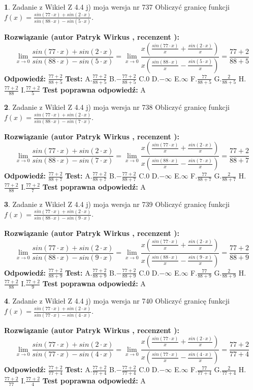 \documentclass[12pt, a4paper]{article}
\theoremstyle{definition} %
\newtheorem{zad}{}
\newcommand{\zadStart}[1]{\begin{zad}#1\newline}
\newcommand{\zadStop}{\end{zad}}
\newcommand{\rozwStart}[2]{\noindent \textbf{Rozwiązanie (autor #1 , recenzent #2): }\newline}
\newcommand{\rozwStop}{\newline}
\newcommand{\odpStart}{\noindent \textbf{Odpowiedź:}\newline}
\newcommand{\odpStop}{\newline}
\newcommand{\testStart}{\noindent \textbf{Test:}\newline}
\newcommand{\testStop}{\newline}
\newcommand{\kluczStart}{\noindent \textbf{Test poprawna odpowiedź:}\newline}
\newcommand{\kluczStop}{\newline}
\begin{document}
\zadStart{Zadanie z Wikieł Z 4.4 j) moja wersja nr 737}
Obliczyć granicę funkcji $f(x)=\frac{sin(77\cdot x) +sin(2\cdot x)}{sin(88\cdot x) -sin(5\cdot x)}$.
\zadStop
\rozwStart{Patryk Wirkus}{}
$$\lim\limits_{x\to 0}\frac{sin(77\cdot x) +sin(2\cdot x)}{sin(88\cdot x) -sin(5\cdot x)}=\lim\limits_{x\to 0}\frac{x(\frac{sin(77\cdot x)}{x}+\frac{sin(2\cdot x)}{x})}{x(\frac{sin(88\cdot x)}{x}-\frac{sin(5\cdot x)}{x})}=\frac{77+2}{88+5}$$
\rozwStop
\odpStart
$\frac{77+2}{88+5}$
\odpStop
\testStart
A.$\frac{77+2}{88+5}$
B.$-\frac{77+2}{88+5}$
C.$0$
D.$-\infty$
E.$\infty$
F.$\frac{77}{88+5}$
G.$\frac{2}{88+5}$
H.$\frac{77+2}{88}$
I.$\frac{77+2}{5}$
\testStop
\kluczStart
A
\kluczStop



\zadStart{Zadanie z Wikieł Z 4.4 j) moja wersja nr 738}
Obliczyć granicę funkcji $f(x)=\frac{sin(77\cdot x) +sin(2\cdot x)}{sin(88\cdot x) -sin(7\cdot x)}$.
\zadStop
\rozwStart{Patryk Wirkus}{}
$$\lim\limits_{x\to 0}\frac{sin(77\cdot x) +sin(2\cdot x)}{sin(88\cdot x) -sin(7\cdot x)}=\lim\limits_{x\to 0}\frac{x(\frac{sin(77\cdot x)}{x}+\frac{sin(2\cdot x)}{x})}{x(\frac{sin(88\cdot x)}{x}-\frac{sin(7\cdot x)}{x})}=\frac{77+2}{88+7}$$
\rozwStop
\odpStart
$\frac{77+2}{88+7}$
\odpStop
\testStart
A.$\frac{77+2}{88+7}$
B.$-\frac{77+2}{88+7}$
C.$0$
D.$-\infty$
E.$\infty$
F.$\frac{77}{88+7}$
G.$\frac{2}{88+7}$
H.$\frac{77+2}{88}$
I.$\frac{77+2}{7}$
\testStop
\kluczStart
A
\kluczStop



\zadStart{Zadanie z Wikieł Z 4.4 j) moja wersja nr 739}
Obliczyć granicę funkcji $f(x)=\frac{sin(77\cdot x) +sin(2\cdot x)}{sin(88\cdot x) -sin(9\cdot x)}$.
\zadStop
\rozwStart{Patryk Wirkus}{}
$$\lim\limits_{x\to 0}\frac{sin(77\cdot x) +sin(2\cdot x)}{sin(88\cdot x) -sin(9\cdot x)}=\lim\limits_{x\to 0}\frac{x(\frac{sin(77\cdot x)}{x}+\frac{sin(2\cdot x)}{x})}{x(\frac{sin(88\cdot x)}{x}-\frac{sin(9\cdot x)}{x})}=\frac{77+2}{88+9}$$
\rozwStop
\odpStart
$\frac{77+2}{88+9}$
\odpStop
\testStart
A.$\frac{77+2}{88+9}$
B.$-\frac{77+2}{88+9}$
C.$0$
D.$-\infty$
E.$\infty$
F.$\frac{77}{88+9}$
G.$\frac{2}{88+9}$
H.$\frac{77+2}{88}$
I.$\frac{77+2}{9}$
\testStop
\kluczStart
A
\kluczStop



\zadStart{Zadanie z Wikieł Z 4.4 j) moja wersja nr 740}
Obliczyć granicę funkcji $f(x)=\frac{sin(77\cdot x) +sin(2\cdot x)}{sin(77\cdot x) -sin(4\cdot x)}$.
\zadStop
\rozwStart{Patryk Wirkus}{}
$$\lim\limits_{x\to 0}\frac{sin(77\cdot x) +sin(2\cdot x)}{sin(77\cdot x) -sin(4\cdot x)}=\lim\limits_{x\to 0}\frac{x(\frac{sin(77\cdot x)}{x}+\frac{sin(2\cdot x)}{x})}{x(\frac{sin(77\cdot x)}{x}-\frac{sin(4\cdot x)}{x})}=\frac{77+2}{77+4}$$
\rozwStop
\odpStart
$\frac{77+2}{77+4}$
\odpStop
\testStart
A.$\frac{77+2}{77+4}$
B.$-\frac{77+2}{77+4}$
C.$0$
D.$-\infty$
E.$\infty$
F.$\frac{77}{77+4}$
G.$\frac{2}{77+4}$
H.$\frac{77+2}{77}$
I.$\frac{77+2}{4}$
\testStop
\kluczStart
A
\kluczStop
\end{document}
